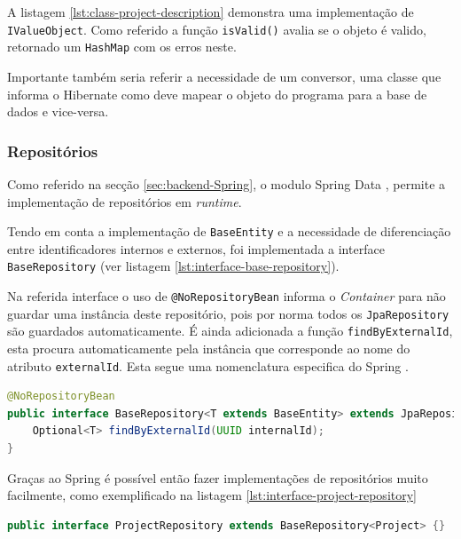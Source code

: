 A listagem \ref{lst:class-project-description} demonstra uma implementação de \lstinline|IValueObject|. Como referido a função \lstinline|isValid()| avalia se o objeto é valido, retornado um \lstinline|HashMap| com os erros neste.

Importante também seria referir a necessidade de um conversor, uma classe que informa o \gls{Hibernate} como deve mapear o objeto do programa para a base de dados e vice-versa.







\subsubsection{Repositórios}

Como referido na secção \ref{sec:backend-Spring}, o modulo Spring Data , permite a implementação de repositórios em \textit{runtime}.

Tendo em conta a implementação de \lstinline|BaseEntity| e a necessidade de diferenciação entre identificadores internos e externos, foi implementada a interface \lstinline|BaseRepository| (ver listagem \ref{lst:interface-base-repository}). 

Na referida interface o uso de \lstinline|@NoRepositoryBean| informa o  \textit{Container} para não guardar uma instância deste repositório, pois por norma todos os \lstinline|JpaRepository| são guardados automaticamente. É ainda adicionada a função \lstinline|findByExternalId|, esta procura automaticamente pela instância que corresponde ao nome do atributo \lstinline|externalId|. Esta segue uma nomenclatura especifica do Spring \cite{docs-spring-repository}.

\begin{lstlisting}[language=Java,caption={Inteface BaseRepository}, label={lst:interface-base-repository}]
@NoRepositoryBean
public interface BaseRepository<T extends BaseEntity> extends JpaRepository<T, UUID> {
    Optional<T> findByExternalId(UUID internalId);
}
\end{lstlisting}

Graças ao \gls{Spring} é possível então fazer implementações de repositórios muito facilmente, como exemplificado na listagem \ref{lst:interface-project-repository}

\begin{lstlisting}[language=Java, caption={interface \textit{ProjectRepository}}, label={lst:interface-project-repository}]
    public interface ProjectRepository extends BaseRepository<Project> {}
\end{lstlisting}







